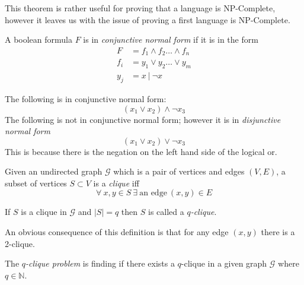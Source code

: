 This theorem is rather useful for proving that a language is NP-Complete,
however it leaves us with the issue of proving a first language is NP-Complete.

\begin{definition}
	A boolean formula $F$ is in \textit{conjunctive normal form} if it is in the form
	\begin{equation}
	\begin{split}
		F &= f_1 \land f_2 \dots \land f_n \\
		f_i &= y_1 \lor y_2 \dots \lor y_m \\
		y_j &= x\ |\ \neg x
	\end{split}
	\end{equation}
\end{definition}

The following is in conjunctive normal form:
$$(x_1 \lor x_2) \land \neg x_3$$
The following is not in conjunctive normal form;
however it is in \textit{disjunctive normal form}
$$(x_1 \lor x_2) \lor \neg x_3$$
This is because there is the negation on the left hand side of the logical or.

\begin{definition}
	Given an undirected graph $\mathcal{G}$ which is a pair of vertices and edges $(V,E)$,
	a subset of vertices $S \subset V$ is a \textit{clique} iff
	$$\forall\ x, y \in S\ \exists\ \textrm{an edge}\ (x,y) \in E$$
\end{definition}

\begin{definition}
	If $S$ is a clique in $\mathcal{G}$ and $|S| = q$ then $S$ is called a \textit{$q$-clique}.
\end{definition}

An obvious consequence of this definition is that for any edge $(x,y)$ there is a 2-clique.

\begin{definition}
	The \textit{$q$-clique problem} is finding if there exists a $q$-clique in a given graph
	$\mathcal{G}$ where $q \in \mathbb{N}$.
\end{definition}

